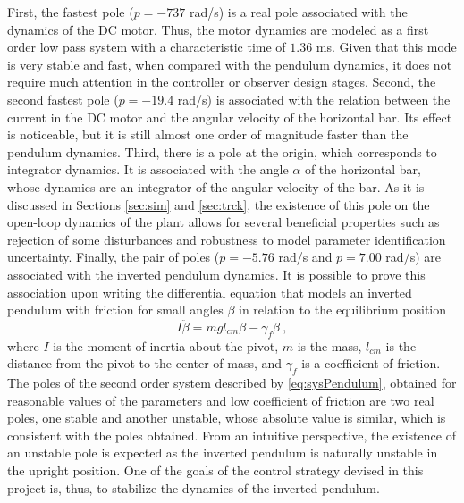 \documentclass[letterpaper, 10 pt, conference]{ieeeconf}
\begin{document}
First, the fastest pole ($p = -737$ rad/s) is a real pole associated with the dynamics of the DC motor. Thus, the motor dynamics are modeled as a first order low pass system with a characteristic time of $1.36$ ms. Given that this mode is very stable and fast, when compared with the pendulum dynamics, it does not require much attention in the controller or observer design stages. Second, the second fastest pole ($p = -19.4$ rad/s) is associated with the relation between the current in the DC motor and the angular velocity of the horizontal bar. Its effect is noticeable, but it is still almost one order of magnitude faster than the pendulum dynamics. Third, there is a pole at the origin, which corresponds to integrator dynamics. It is associated with the angle $\alpha$ of the horizontal bar, whose dynamics are an integrator of the angular velocity of the bar. As it is discussed in Sections \ref{sec:sim} and \ref{sec:trck}, the existence of this pole on the open-loop dynamics of the plant allows for several beneficial properties such as rejection of some disturbances and robustness to model parameter identification uncertainty. Finally, the pair of poles ($p = -5.76$ rad/s and $p = 7.00$ rad/s) are associated with the inverted pendulum dynamics. It is possible to prove this association upon writing the differential equation that models an inverted pendulum with friction for small angles $\beta$ in relation to the equilibrium position
\begin{equation}\label{eq:sysPendulum}
    I\ddot{\beta} = mgl_{cm}\beta-\gamma_f\dot{\beta}\:,
\end{equation}
where $I$ is the moment of inertia about the pivot, $m$ is the mass, $l_{cm}$ is the distance from the pivot to the center of mass, and $\gamma_f$ is a coefficient of friction. The poles of the second order system described by \eqref{eq:sysPendulum}, obtained for reasonable values of the parameters and low coefficient of friction are two real poles, one stable and another unstable, whose absolute value is similar, which is consistent with the poles obtained. From an intuitive perspective, the existence of an unstable pole is expected as the inverted pendulum is naturally unstable in the upright position. One of the goals of the control strategy devised in this project is, thus, to stabilize the dynamics of the inverted pendulum.
\end{document}
